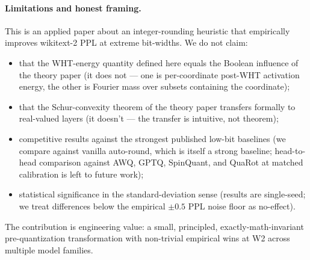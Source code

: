 \documentclass[11pt]{article}
\begin{document}
\paragraph{Limitations and honest framing.}
This is an applied paper about an integer-rounding heuristic that empirically improves wikitext-2 PPL at extreme bit-widths. We do not claim:
\begin{itemize}
    \item that the WHT-energy quantity defined here equals the Boolean influence of the theory paper (it does not --- one is per-coordinate post-WHT activation energy, the other is Fourier mass over subsets containing the coordinate);
    \item that the Schur-convexity theorem of the theory paper transfers formally to real-valued layers (it doesn't --- the transfer is intuitive, not theorem);
    \item competitive results against the strongest published low-bit baselines (we compare against vanilla auto-round, which is itself a strong baseline; head-to-head comparison against AWQ, GPTQ, SpinQuant, and QuaRot at matched calibration is left to future work);
    \item statistical significance in the standard-deviation sense (results are single-seed; we treat differences below the empirical $\pm 0.5$ PPL noise floor as no-effect).
\end{itemize}

The contribution is engineering value: a small, principled, exactly-math-invariant pre-quantization transformation with non-trivial empirical wins at W2 across multiple model families.
\end{document}
